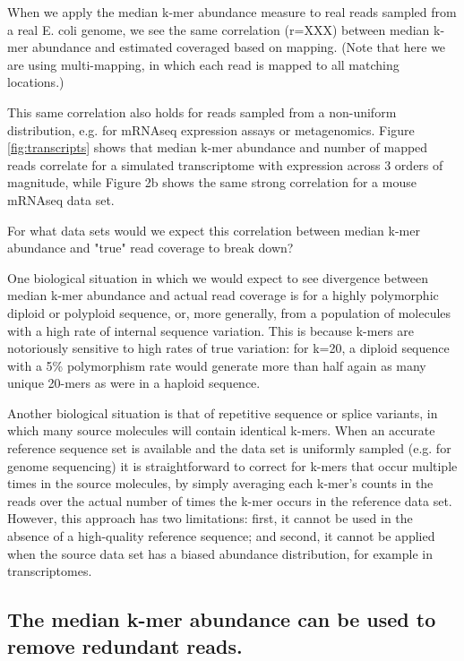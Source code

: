 \documentclass[10pt]{article}
\begin{document}
When we apply the median k-mer abundance measure to real reads sampled
from a real E. coli genome, we see the same correlation (r=XXX)
between median k-mer abundance and estimated coveraged based on mapping.
(Note that here we are using multi-mapping, in which each read is mapped
to all matching locations.)

This same correlation also holds for reads sampled from a non-uniform
distribution, e.g. for mRNAseq expression assays or metagenomics.
Figure \ref{fig:transcripts} shows that median k-mer abundance and number of mapped reads
correlate for a simulated transcriptome with expression across 3
orders of magnitude, while Figure 2b shows the same strong correlation
for a mouse mRNAseq data set.

For what data sets would we expect this correlation between median
k-mer abundance and "true" read coverage to break down?

One biological situation in which we would expect to see divergence
between median k-mer abundance and actual read coverage is for a
highly polymorphic diploid or polyploid sequence, or, more generally,
from a population of molecules with a high rate of internal sequence
variation.  This is because k-mers are notoriously sensitive to high
rates of true variation: for k=20, a diploid sequence with a 5\%
polymorphism rate would generate more than half again as many unique
20-mers as were in a haploid sequence.

Another biological situation is that of repetitive sequence or splice
variants, in which many source molecules will contain identical
k-mers.  When an accurate reference sequence set is available and the
data set is uniformly sampled (e.g. for genome sequencing) it is
straightforward to correct for k-mers that occur multiple times in the
source molecules, by simply averaging each k-mer's counts in the reads
over the actual number of times the k-mer occurs in the reference data
set.  However, this approach has two limitations: first, it cannot be
used in the absence of a high-quality reference sequence; and second,
it cannot be applied when the source data set has a biased abundance
distribution, for example in transcriptomes.


\subsection*{The median k-mer abundance can be used to remove redundant reads.}
\end{document}
